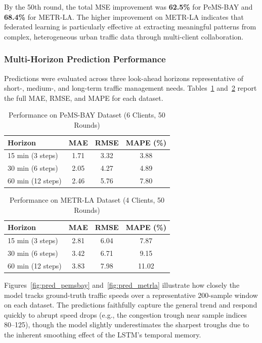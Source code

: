 \documentclass[pdflatex,sn-mathphys-num]{sn-jnl}
\theoremstyle{thmstyleone}
\theoremstyle{thmstyletwo}
\theoremstyle{thmstylethree}
\begin{document}
By the 50th round, the total MSE improvement was \textbf{62.5\%} for PeMS-BAY and \textbf{68.4\%} for METR-LA. The higher improvement on METR-LA indicates that federated learning is particularly effective at extracting meaningful patterns from complex, heterogeneous urban traffic data through multi-client collaboration.

\subsubsection{Multi-Horizon Prediction Performance}

Predictions were evaluated across three look-ahead horizons representative of short-, medium-, and long-term traffic management needs. Tables~\ref{tab:pems_results} and~\ref{tab:metrla_results} report the full MAE, RMSE, and MAPE for each dataset.

\begin{table}[h]
\caption{Performance on PeMS-BAY Dataset (6 Clients, 50 Rounds)}\label{tab:pems_results}
\begin{tabular}{@{}lccc@{}}
\toprule
\textbf{Horizon} & \textbf{MAE} & \textbf{RMSE} & \textbf{MAPE (\%)} \\
\midrule
15 min (3 steps)  & 1.71 & 3.32 & 3.88 \\
30 min (6 steps)  & 2.05 & 4.27 & 4.89 \\
60 min (12 steps) & 2.46 & 5.76 & 7.80 \\
\bottomrule
\end{tabular}
\end{table}

\begin{table}[h]
\caption{Performance on METR-LA Dataset (4 Clients, 50 Rounds)}\label{tab:metrla_results}
\begin{tabular}{@{}lccc@{}}
\toprule
\textbf{Horizon} & \textbf{MAE} & \textbf{RMSE} & \textbf{MAPE (\%)} \\
\midrule
15 min (3 steps)  & 2.81 & 6.04 &  7.87 \\
30 min (6 steps)  & 3.42 & 6.71 &  9.15 \\
60 min (12 steps) & 3.83 & 7.98 & 11.02 \\
\bottomrule
\end{tabular}
\end{table}

Figures~\ref{fig:pred_pemsbay} and~\ref{fig:pred_metrla} illustrate how closely the model tracks ground-truth traffic speeds over a representative 200-sample window on each dataset. The predictions faithfully capture the general trend and respond quickly to abrupt speed drops (e.g., the congestion trough near sample indices 80--125), though the model slightly underestimates the sharpest troughs due to the inherent smoothing effect of the LSTM's temporal memory.
\end{document}
